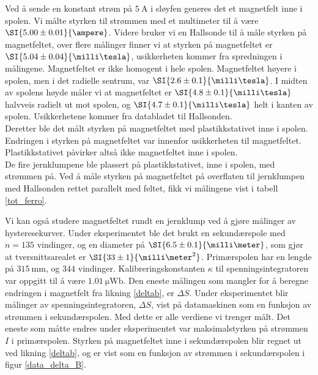 \documentclass[%
 reprint,
nofootinbib,
aps,
]{revtex4-1}
\begin{document}
Ved å sende en konstant strøm på $\SI{5}{\ampere}$ i sløyfen generes det et magnetfelt inne i spolen. Vi målte styrken til strømmen med et multimeter til å være $\SI{5.00\pm0.01}{\ampere}$. Videre bruker vi en Hallsonde til å måle styrken på magnetfeltet, over flere målinger finner vi at styrken på magnetfeltet er $\SI{5.04\pm0.04}{\milli\tesla}$, usikkerheten kommer fra spredningen i målingene. Magnetfeltet er ikke homogent i hele spolen. Magnetfeltet høyere i spolen, men i det radielle sentrum, var $\SI{2.6\pm0.1}{\milli\tesla}$. I midten av spolens høyde måler vi at magnetfeltet er $\SI{4.8\pm0.1}{\milli\tesla}$ halvveis radielt ut mot spolen, og $\SI{4.7\pm0.1}{\milli\tesla}$ helt i kanten av spolen. Usikkerhetene kommer fra databladet til Hallsonden.\\
Deretter ble det målt styrken på magnetfeltet med plastikkstativet inne i spolen. Endringen i styrken på magnetfeltet var innenfor usikkerheten til magnetfeltet. Plastikkstativet påvirker altså ikke magnetfeltet inne i spolen. \\
De fire jernklumpene ble plassert på plastikkstativet, inne i spolen, med strømmen på. Ved å måle styrken på magnetfeltet på overflaten til jernklumpen med Hallsonden rettet parallelt med feltet, fikk vi målingene vist i tabell \vref{tot_ferro}.\par
Vi kan også studere magnetfeltet rundt en jernklump ved å gjøre målinger av hysteresekurver. Under eksperimentet ble det brukt en sekundærspole med $n=135$ vindinger, og en diameter på $\SI{6.5\pm0.1}{\milli\meter}$, som gjør at tversnittsarealet er $\SI{33\pm1}{\milli\meter^2}$. Primærspolen har en lengde på $\SI{315}{\milli\meter}$, og $344$ vindinger. Kalibreringskonstanten $\kappa$ til spenningsintegratoren var oppgitt til å være $\SI{1.01}{\micro\weber}$. Den eneste målingen som mangler for å beregne endringen i magnetfelt fra likning \eqref{deltab}, er $\Delta S$.
Under eksperimentet blir målinger av spenningsintegratoren, $\Delta S$, vist på datamaskinen som en funksjon av strømmen i sekundærspolen. Med dette er alle verdiene vi trenger målt. Det eneste som måtte endres under eksperimentet var maksimalstyrken på strømmen $I$ i primærspolen. Styrken på magnetfeltet inne i sekundærspolen blir regnet ut ved likning \eqref{deltab}, og er vist som en funksjon av strømmen i sekundærspolen i figur \vref{data_delta_B}.
\end{document}
